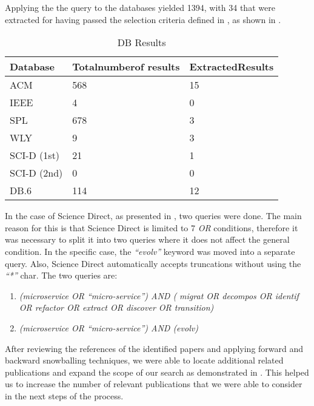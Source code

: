 Applying the the query to the databases yielded 1394, with 34 that were
extracted for having passed the selection criteria defined in
, as shown in .

\begin{table}[!htb] \caption{DB Results} \label{tab:other-db-search}
  \begin{center}
    \begin{tabular}[c]{p{5em}|p{5em}|p{5em}}
      \textbf{Database} &
      \textbf{Total\newline number\newline of results} &
      \textbf{Extracted\newline Results} \\
      \hline {ACM} & {568} & {15} \\
      \hline {IEEE} & {4} & {0} \\
      \hline {SPL} & {678} & {3} \\
      \hline {WLY} & {9} & {3} \\
      \hline {SCI-D (1st)} & {21} & {1} \\
      \hline {SCI-D (2nd)} & {0} & {0} \\
      \hline {DB.6} & {114} & {12} \\
    \end{tabular}
  \end{center}
\end{table}

In the case of Science Direct, as presented in ,
two queries were done. The main reason for this is that Science Direct is
limited to 7 \textit{OR} conditions, therefore it was necessary to split it
into two queries where it does not affect the general condition. In the
specific case, the \textit{``evolv''} keyword was moved into a separate query.
Also, Science Direct automatically accepts truncations without using the
\textit{``*''} char. The two queries are:

\begin{enumerate}
  \item \emph{(microservice OR ``micro-service'') AND ( migrat OR decompos OR
    identif OR refactor OR extract OR discover OR transition)}
  \item \emph{(microservice OR ``micro-service'') AND (evolv)}
\end{enumerate}

After reviewing the references of the identified papers and applying forward
and backward snowballing techniques, we were able to locate additional related
publications and expand the scope of our search as demonstrated in
. This helped us to increase the number of relevant
publications that we were able to consider in the next steps of the process.

